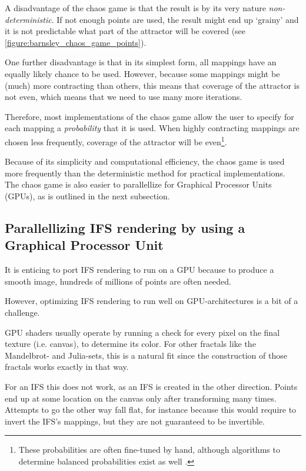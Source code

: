 \documentclass[11pt]{article}
\begin{document}
A disadvantage of the chaos game is that the result is by its very nature \emph{non-deterministic}.
If not enough points are used, the result might end up `grainy' and it is not predictable what part of the attractor will be covered (see \autoref{figure:barnsley_chaos_game_points}).

One further disadvantage is that in its simplest form, all mappings have an equally likely chance to be used.
However, because some mappings might be (much) more contracting than others, this means that coverage of the attractor is not even,
which means that we need to use many more iterations.

Therefore, most implementations of the chaos game allow the user to specify for each mapping a \emph{probability} that it is used. 
When highly contracting mappings are chosen less frequently, coverage of the attractor will be even\footnote{These probabilities are often fine-tuned by hand, although algorithms to determine balanced probabilities exist as well \cite{hepting1991rendering}.}.

Because of its simplicity and computational efficiency, the chaos game is used more frequently than the deterministic method for practical implementations.
The chaos game is also easier to parallellize for Graphical Processor Units (GPUs), as is outlined in the next subsection.

\subsection{Parallellizing IFS rendering by using a Graphical Processor Unit}
\label{sec:org0b92ca0}

It is enticing to port IFS rendering to run on a GPU because to produce a smooth image, hundreds of millions of points are often needed.

However, optimizing IFS rendering to run well on GPU-architectures is a bit of a challenge.

GPU shaders usually operate by running a check for every pixel on the final texture (i.e. canvas), to determine its color.
For other fractals like the Mandelbrot- and Julia-sets, this is a natural fit since the construction of those fractals works exactly in that way.

For an IFS this does not work, as an IFS is created in the other direction. Points end up at some location on the canvas only after transforming many times.
Attempts to go the other way fall flat, for instance because this would require to invert the IFS's mappings, but they are not guaranteed to be invertible.
\end{document}
